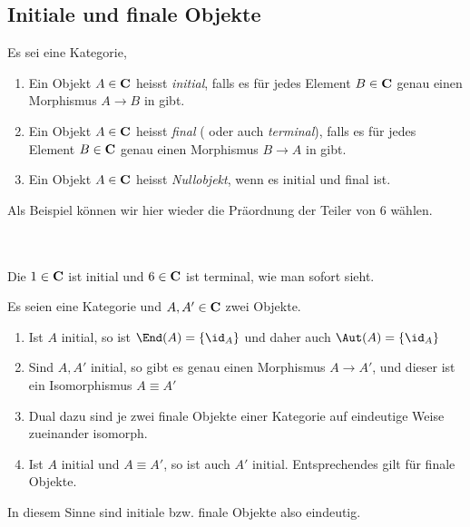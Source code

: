 \documentclass{article}
\begin{document}
\begin{bsp}[Fundamentalgruppoid]
\section{Initiale und finale Objekte}
\begin{defi}
 \cite[Definition 2.5.1]{Bra}
	Es sei \CatC eine Kategorie,
	\begin{enumerate}
		\item	 Ein Objekt \( A \in \mathbf{C} \) heisst \emph{initial}, 
		falls es f\"ur jedes Element \( B \in \mathbf{C} \) genau einen Morphismus \(A \to B \) in \CatC gibt.
		\item	 Ein Objekt \( A \in \mathbf{C} \) heisst \emph{final} ( oder auch \emph{terminal}), 
		falls es f\"ur jedes Element \( B \in \mathbf{C} \) genau einen Morphismus \(B \to A \) in \CatC gibt.
		\item	Ein Objekt \( A \in \mathbf{C} \) heisst \emph{Nullobjekt}, wenn es initial und final ist.
	\end{enumerate}
\end{defi}
	Als Beispiel k\"onnen wir hier wieder die Pr\"aordnung der Teiler von 6 w\"ahlen.\\
	\begin{bsp}\\
	 \\
	Die \( 1 \in \mathbf{C} \) ist initial und  \(6 \in \mathbf{C} \) ist terminal, wie man sofort sieht.
	\end{bsp}
	
\begin{lem}[Eindeutigkeit]
 {\cite[Lemma 2.5.5]{Bra}}
	Es seien \CatC eine Kategorie und 
	\(A , A' \in \mathbf{C} \) zwei Objekte.
	\begin{enumerate}
		\item Ist \(A \) initial, so ist \( \End(A)= \left\lbrace \id_A \right\rbrace \) und daher auch \( \Aut(A)=\left\lbrace \id_A \right\rbrace \)
		\item Sind \( A,A' \) initial, so gibt es genau einen Morphismus \( A \to A' \), und dieser ist ein Isomorphismus \( A \equiv A' \) 
		\item Dual dazu sind je zwei finale Objekte einer Kategorie auf eindeutige Weise zueinander isomorph.
		\item Ist \( A \) initial und \( A \equiv A' \), so ist auch \( A' \) initial. Entsprechendes gilt f\"ur finale Objekte.
	\end{enumerate}
	In diesem Sinne sind initiale bzw. finale Objekte also eindeutig.
\end{lem}
\newpage

\end{bsp}
\end{document}
